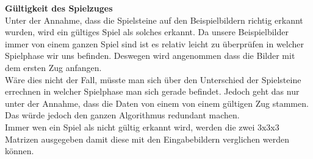 \documentclass[paper=A4, deutsch]{scrartcl}
\begin{document}
\textbf{Gültigkeit des Spielzuges}\\
Unter der Annahme, dass die Spielsteine auf den Beispielbildern richtig erkannt wurden, wird ein gültiges Spiel als solches erkannt. Da unsere Beispielbilder immer von einem ganzen Spiel sind ist es relativ leicht zu überprüfen in welcher Spielphase wir uns befinden. Deswegen wird angenommen dass die Bilder mit dem ersten Zug anfangen.\\
Wäre dies nicht der Fall, müsste man sich über den Unterschied der Spielsteine errechnen in welcher Spielphase man sich gerade befindet. Jedoch geht das nur unter der Annahme, dass die Daten von einem von einem gültigen Zug stammen. Das würde jedoch den ganzen Algorithmus redundant machen.\\
Immer wen ein Spiel als nicht gültig erkannt wird, werden die zwei 3x3x3 Matrizen ausgegeben damit diese mit den Eingabebildern verglichen werden können.
\end{document}
